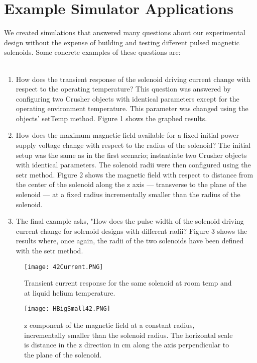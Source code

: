 \documentclass[prb,preprint]{revtex4-1}
\begin{document}
\section{Example Simulator Applications}
We created simulations that answered many questions about our experimental design without the expense of building and testing different pulsed magnetic solenoids.  Some concrete examples of these questions are: 
\\
\\
\begin{enumerate}
\item How does the transient response of the solenoid driving current change with respect to the operating temperature? This question was answered by configuring two Crusher objects with identical parameters except for the operating environment temperature.  This parameter was changed using the objects' setTemp method.  Figure 1 shows the graphed results.
\item How does the maximum magnetic field available for a fixed initial power supply voltage change with respect to the radius of the solenoid? The initial setup was the same as in the first scenario; instantiate two Crusher objects with identical parameters.  The solenoid radii were then configured using the setr method.  Figure 2 shows the magnetic field with respect to distance from the center of the solenoid along the z axis --- transverse to the plane of the solenoid --- at a fixed radius incrementally smaller than the radius of the solenoid. 
\item The final example asks, "How does the pulse width  of the solenoid driving current change for solenoid designs with different radii? Figure 3 shows the results where, once again, the radii of the two solenoids have been defined with the setr method.
\end{enumerate}
\begin{figure}[page]
\centering
\texttt{[image: 42Current.PNG]}
\caption{Transient current response for the same solenoid at room temp and at liquid helium temperature.}
\label{sunsets}
\end{figure}
\begin{figure}[h!]
\centering
\texttt{[image: HBigSmall42.PNG]}
\caption{z component of the magnetic field at a constant radius, incrementally smaller than the solenoid radius.  The horizontal scale is distance in the z direction in cm along the axis perpendicular to the plane of the solenoid.}
\label{sunsets}
\end{figure}
\end{document}
